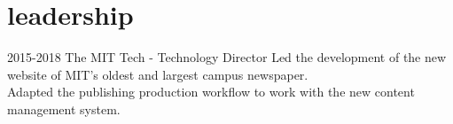 \documentclass[__VERSION__]{friggeri-cv} %
\begin{document}
\section{leadership}

\begin{entrylist}
  \entry
  {2015-2018}
  {The MIT Tech - Technology Director}
  {}
  {Led the development of the new website of MIT's oldest and largest campus newspaper. \\
  Adapted the publishing production workflow to work with the new content management system. }
\end{entrylist}
\end{document}
